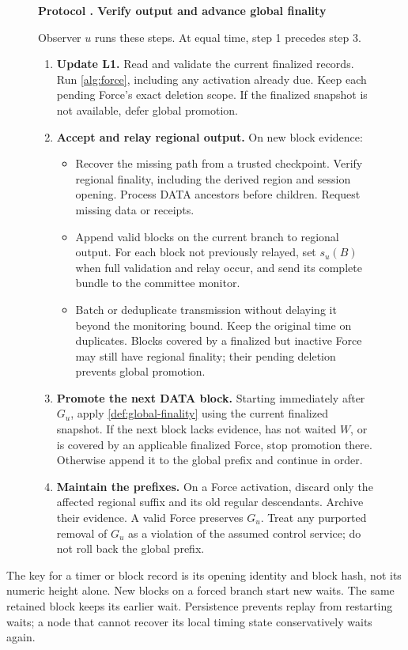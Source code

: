 \documentclass[11pt,a4paper]{article}
\newcounter{protocol}
\newenvironment{protocol}[2]{\begin{figure}[htbp]\refstepcounter{protocol}\label{#1}
\begin{mdframed}[linewidth=.6pt,skipabove=0pt,skipbelow=0pt,
innertopmargin=7pt,innerbottommargin=7pt]\small
\textbf{Protocol \theprotocol. #2}\par\smallskip}{\end{mdframed}\end{figure}}
\begin{document}
\begin{protocol}{alg:external}{Verify output and advance global finality}
Observer $u$ runs these steps. At equal time, step 1 precedes step 3.
\begin{enumerate}[label=\textbf{\arabic*)},itemsep=3pt]
\item \textbf{Update L1.} Read and validate the current finalized
records. Run \cref{alg:force}, including any activation already due.
Keep each pending Force's exact deletion scope. If the finalized
snapshot is not available, defer global promotion.

\item \textbf{Accept and relay regional output.} On new block evidence:
\begin{itemize}
\item Recover the missing path from a trusted checkpoint. Verify
regional finality, including the derived region and session opening.
Process DATA ancestors before children. Request missing data or receipts.
\item Append valid blocks on the current branch to regional output.
For each block not previously relayed, set $s_u(B)$ when full validation
and relay occur, and send its complete bundle to the committee monitor.
\item Batch or deduplicate transmission without delaying it beyond
the monitoring bound. Keep the original time on duplicates. Blocks
covered by a finalized but inactive Force may still have regional
finality; their pending deletion prevents global promotion.
\end{itemize}

\item \textbf{Promote the next DATA block.} Starting immediately after
$G_u$, apply \cref{def:global-finality} using the current finalized
snapshot. If the next block lacks evidence, has not waited $W$, or is
covered by an applicable finalized Force, stop promotion there.
Otherwise append it to the global prefix and continue in order.

\item \textbf{Maintain the prefixes.} On a Force activation, discard
only the affected regional suffix and its old regular descendants.
Archive their evidence. A valid Force preserves $G_u$. Treat any
purported removal of $G_u$ as a violation of the assumed control
service; do not roll back the global prefix.
\end{enumerate}
\end{protocol}

The key for a timer or block record is its opening identity and block
hash, not its numeric height alone. New blocks on a forced branch start
new waits. The same retained block keeps its earlier wait. Persistence
prevents replay from restarting waits; a node that cannot recover its
local timing state conservatively waits again.
\end{document}
